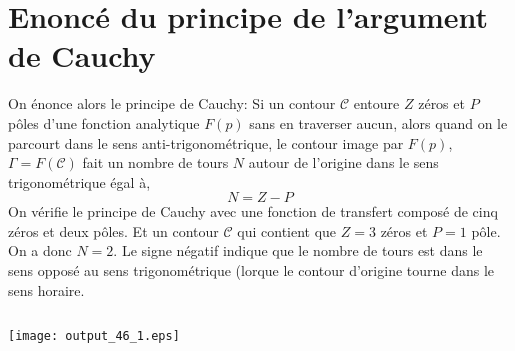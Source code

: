 \section{Enoncé du principe de l'argument de Cauchy}
On énonce alors le principe de Cauchy:
Si un contour \(\mathcal{C}\) entoure \(Z\) zéros et \(P\) pôles d'une
fonction analytique \(F(p)\) sans en traverser aucun, alors quand on le
parcourt dans le sens anti-trigonométrique, le contour image par
\(F(p)\), \(\Gamma=F(\mathcal{C})\) fait un nombre de tours \(N\) autour
de l'origine dans le sens trigonométrique égal à,
\[
    N=Z-P
\]
On vérifie le principe de Cauchy avec une fonction de transfert composé
de cinq zéros et deux pôles. Et un contour \(\mathcal{C}\) qui contient 
que \(Z=3\) zéros et \(P=1\) pôle. On a donc \(N=2\). Le signe négatif
indique que le nombre de tours est dans le sens opposé au sens
trigonométrique (lorque le contour d'origine tourne dans le sens
horaire.
\begin{tcolorbox}[breakable, size=fbox, boxrule=1pt, pad at break*=1mm,colback=cellbackground, colframe=cellborder]
\inputminted{python}{codes/python/annexe_cauchy_cellule17.py}
\end{tcolorbox}
\begin{center}
    \texttt{[image: output\_46\_1.eps]}
\end{center}
